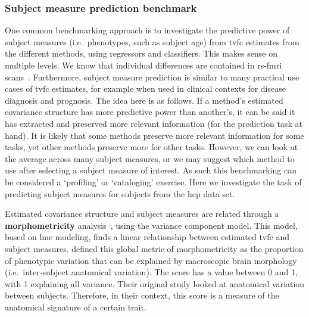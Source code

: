 \subsubsection{Subject measure prediction benchmark}

One common benchmarking approach is to investigate the predictive power of subject measures (i.e.~phenotypes, such as subject age) from \gls{tvfc} estimates from the different methods, using regressors and classifiers.
This makes sense on multiple levels.
We know that individual differences are contained in \gls{rs-fmri} scans~\parencite{Finn2015}.
Furthermore, subject measure prediction is similar to many practical use cases of \gls{tvfc} estimates, for example when used in clinical contexts for disease diagnosis and prognosis.
%
The idea here is as follows.
If a method's estimated covariance structure has more predictive power than another's, it can be said it has extracted and preserved more relevant information (for the prediction task at hand).
It is likely that some methods preserve more relevant information for some tasks, yet other methods preserve more for other tasks.
However, we can look at the average across many subject measures, or we may suggest which method to use after selecting a subject measure of interest.
As such this benchmarking can be considered a `profiling' or `cataloging' exercise.
Here we investigate the task of predicting subject measures for subjects from the \gls{hcp} data set.

Estimated covariance structure and subject measures are related through a \textbf{morphometricity} analysis~\parencite{Sabuncu2016}, using the variance component model.
This model, based on \gls{lme} modeling, finds a linear relationship between estimated \gls{tvfc} and subject measures.
\textcite{Sabuncu2016} defined this global metric of morphometricity as the proportion of phenotypic variation that can be explained by macroscopic brain morphology (i.e.~inter-subject anatomical variation).
The score has a value between 0 and 1, with 1 explaining all variance.
Their original study looked at anatomical variation between subjects.
Therefore, in their context, this score is a measure of the anatomical signature of a certain trait.

